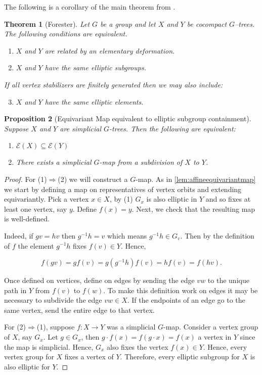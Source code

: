 \documentclass[12pt,parskip=full]{report}
\theoremstyle{plain}
\newtheorem{thm}{Theorem}[section]
\newtheorem{prop}[thm]{Proposition}
\theoremstyle{definition}
\begin{document}
The following is a corollary of the main theorem from \cite{foresterdeformationrigidity}.
\begin{thm} [Forester]
    \label{thm:forester}
    Let \(G\) be a group and let \(X\) and \(Y\) be cocompact \(G\)–trees. The following conditions are equivalent.
    \begin{enumerate}
        \item \(X\) and \(Y\) are related by an elementary deformation. 
        \item \(X\) and \(Y\) have the same elliptic subgroups.
    \end{enumerate}
If all vertex stabilizers are finitely generated then we may also include:
\begin{enumerate}
    \setcounter{enumi}{2}
    \item \(X\) and \(Y\) have the same elliptic elements.
\end{enumerate}
\end{thm}

\begin{prop}
[Equivariant Map equivalent to elliptic subgroup containment]
\label{pro:gmapfromsubset}
Suppose $X$ and $Y$ are simplicial \(G\)-trees. Then the following are equivalent:
\begin{enumerate}
    \item \(\mathcal{E}(X) \subseteq \mathcal{E}(Y)\)
    \item There exists a simplicial $G$-map from a subdivision of $X$ to $Y$.
\end{enumerate}
\end{prop}
\begin{proof}
    For (1)$\Rightarrow$(2) we will construct a $G$-map. As in \ref{lem:affineequivariantmap} we start by defining a map on representatives of vertex orbits and extending equivariantly. Pick a vertex \(x\in X\), by (1) \(G_x\) is also elliptic in \(Y\) and so fixes at least one vertex, say \(y\). Define \(f(x)=y\). Next, we check that the resulting map is well-defined.
    
    Indeed, if \(gv = hv\) then \(g^{-1}h = v\) which means \(g^{-1}h \in G_v\). Then by the definition of \(f\) the element \(g^{-1}h\) fixes \(f(v)\in Y\). Hence,
    
    \[f(gv) = gf(v) = g(g^{-1}h)f(v) = hf(v) = f(hv).\]
    
    Once defined on vertices, define on edges by sending the edge \(vw\) to the unique path in \(Y\) from \(f(v)\) to \(f(w)\). To make this definition work on edges it may be necessary to subdivide the edge \(vw \in X\). If the endpoints of an edge go to the same vertex, send the entire edge to that vertex. 
    
    For (2)$\Rightarrow$(1), suppose $f:X\to Y$ was a simplicial $G$-map. Consider a vertex group of $X$, say $G_x$. Let $g\in G_x$, then $g\cdot f(x)=f(g\cdot x)=f(x)$ a vertex in $Y$ since the map is simplicial. Hence, $G_x$ also fixes the vertex $f(x)\in Y$. Hence, every vertex group for $X$ fixes a vertex of $Y$. Therefore, every elliptic subgroup for $X$ is also elliptic for $Y$.
\end{proof}
\end{document}
